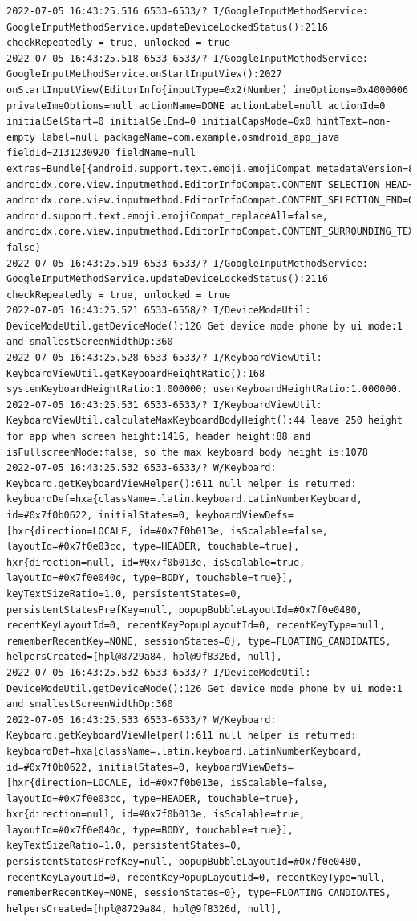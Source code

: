 \documentclass[a4paper,12pt]{book}
\begin{document}
\begin{lstlisting}
2022-07-05 16:43:25.516 6533-6533/? I/GoogleInputMethodService: GoogleInputMethodService.updateDeviceLockedStatus():2116 checkRepeatedly = true, unlocked = true
2022-07-05 16:43:25.518 6533-6533/? I/GoogleInputMethodService: GoogleInputMethodService.onStartInputView():2027 onStartInputView(EditorInfo{inputType=0x2(Number) imeOptions=0x4000006 privateImeOptions=null actionName=DONE actionLabel=null actionId=0 initialSelStart=0 initialSelEnd=0 initialCapsMode=0x0 hintText=non-empty label=null packageName=com.example.osmdroid_app_java fieldId=2131230920 fieldName=null extras=Bundle[{android.support.text.emoji.emojiCompat_metadataVersion=8, androidx.core.view.inputmethod.EditorInfoCompat.CONTENT_SELECTION_HEAD=0, androidx.core.view.inputmethod.EditorInfoCompat.CONTENT_SELECTION_END=0, android.support.text.emoji.emojiCompat_replaceAll=false, androidx.core.view.inputmethod.EditorInfoCompat.CONTENT_SURROUNDING_TEXT=}]}, false)
2022-07-05 16:43:25.519 6533-6533/? I/GoogleInputMethodService: GoogleInputMethodService.updateDeviceLockedStatus():2116 checkRepeatedly = true, unlocked = true
2022-07-05 16:43:25.521 6533-6558/? I/DeviceModeUtil: DeviceModeUtil.getDeviceMode():126 Get device mode phone by ui mode:1 and smallestScreenWidthDp:360
2022-07-05 16:43:25.528 6533-6533/? I/KeyboardViewUtil: KeyboardViewUtil.getKeyboardHeightRatio():168 systemKeyboardHeightRatio:1.000000; userKeyboardHeightRatio:1.000000.
2022-07-05 16:43:25.531 6533-6533/? I/KeyboardViewUtil: KeyboardViewUtil.calculateMaxKeyboardBodyHeight():44 leave 250 height for app when screen height:1416, header height:88 and isFullscreenMode:false, so the max keyboard body height is:1078
2022-07-05 16:43:25.532 6533-6533/? W/Keyboard: Keyboard.getKeyboardViewHelper():611 null helper is returned: keyboardDef=hxa{className=.latin.keyboard.LatinNumberKeyboard, id=#0x7f0b0622, initialStates=0, keyboardViewDefs=[hxr{direction=LOCALE, id=#0x7f0b013e, isScalable=false, layoutId=#0x7f0e03cc, type=HEADER, touchable=true}, hxr{direction=null, id=#0x7f0b013e, isScalable=true, layoutId=#0x7f0e040c, type=BODY, touchable=true}], keyTextSizeRatio=1.0, persistentStates=0, persistentStatesPrefKey=null, popupBubbleLayoutId=#0x7f0e0480, recentKeyLayoutId=0, recentKeyPopupLayoutId=0, recentKeyType=null, rememberRecentKey=NONE, sessionStates=0}, type=FLOATING_CANDIDATES, helpersCreated=[hpl@8729a84, hpl@9f8326d, null], 
2022-07-05 16:43:25.532 6533-6533/? I/DeviceModeUtil: DeviceModeUtil.getDeviceMode():126 Get device mode phone by ui mode:1 and smallestScreenWidthDp:360
2022-07-05 16:43:25.533 6533-6533/? W/Keyboard: Keyboard.getKeyboardViewHelper():611 null helper is returned: keyboardDef=hxa{className=.latin.keyboard.LatinNumberKeyboard, id=#0x7f0b0622, initialStates=0, keyboardViewDefs=[hxr{direction=LOCALE, id=#0x7f0b013e, isScalable=false, layoutId=#0x7f0e03cc, type=HEADER, touchable=true}, hxr{direction=null, id=#0x7f0b013e, isScalable=true, layoutId=#0x7f0e040c, type=BODY, touchable=true}], keyTextSizeRatio=1.0, persistentStates=0, persistentStatesPrefKey=null, popupBubbleLayoutId=#0x7f0e0480, recentKeyLayoutId=0, recentKeyPopupLayoutId=0, recentKeyType=null, rememberRecentKey=NONE, sessionStates=0}, type=FLOATING_CANDIDATES, helpersCreated=[hpl@8729a84, hpl@9f8326d, null], 

\end{lstlisting}
\end{document}

